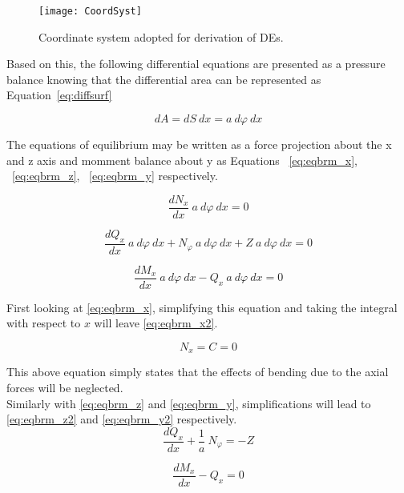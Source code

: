\begin{figure}[H]
	\centering
	\texttt{[image: CoordSyst]}
	\caption{Coordinate system adopted for derivation of DEs.}
	\label{fig:CoordSyst}
\end{figure}

Based on this, the following differential equations are presented as a pressure balance knowing that the differential area can be represented as Equation~\ref{eq:diffsurf}
 
\begin{equation}
	\label{eq:diffsurf}
	dA = dS\ dx = a\ d\varphi \ dx   
\end{equation}

The equations of equilibrium may be written as a force projection about the x and z axis and momment balance about y as Equations ~\ref{eq:eqbrm_x}, ~\ref{eq:eqbrm_z}, ~\ref{eq:eqbrm_y} respectively.

\begin{equation}
	\label{eq:eqbrm_x}
	\frac{dN_x}{dx}\ a\ d\varphi \ dx = 0
\end{equation}

\begin{equation}
	\label{eq:eqbrm_z}
	\frac{dQ_x}{dx}\ a\ d\varphi \ dx+ N_\varphi \ a\ d\varphi \ dx +Z\ a\ d\varphi \ dx= 0
\end{equation}

\begin{equation}
	\label{eq:eqbrm_y}
	\frac{dM_x}{dx}\ a\ d\varphi \ dx- Q_x\ a\ d\varphi \ dx= 0
\end{equation}

First looking at \ref{eq:eqbrm_x}, simplifying this equation and taking the integral with respect to $x$ will leave \ref{eq:eqbrm_x2}. 

\begin{equation}
	\label{eq:eqbrm_x2}
	N_x = C = 0 
\end{equation}

This above equation simply states that the effects of bending due to the axial forces will be neglected.\\

Similarly with \ref{eq:eqbrm_z} and \ref{eq:eqbrm_y}, simplifications will lead to \ref{eq:eqbrm_z2} and \ref{eq:eqbrm_y2} respectively.
\begin{equation}
	\label{eq:eqbrm_z2}
	\frac{dQ_x}{dx}+\frac{1}{a}\ N_\varphi = -Z
\end{equation}

\begin{equation}
	\label{eq:eqbrm_y2}
	\frac{dM_x}{dx}- Q_x= 0
\end{equation} 

